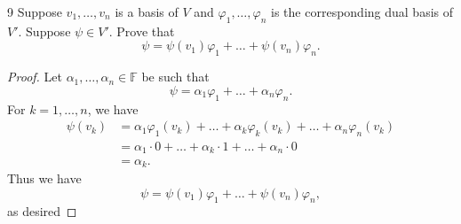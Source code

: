 \documentclass{extarticle}
\newenvironment{problem}[1]{\begin{prob*}{#1}{}}{\end{prob*}}
\newcommand{\F}{\mathbb{F}}
\begin{document}
\begin{problem}{9}
Suppose $v_1,\dots, v_n$ is a basis of $V$ and $\varphi_1,\dots,\varphi_n$ is the corresponding dual basis of $V'$.  Suppose $\psi\in V'$.  Prove that 
\begin{equation*}
\psi = \psi(v_1)\varphi_1 + \dots + \psi(v_n)\varphi_n.
\end{equation*}
\end{problem}
\begin{proof}
Let $\alpha_1,\dots,\alpha_n\in\F$ be such that
\begin{equation*}
\psi = \alpha_1\varphi_1 + \dots + \alpha_n\varphi_n.
\end{equation*}
For $k = 1,\dots, n$, we have
\begin{align*}
\psi(v_k) &= \alpha_1\varphi_1(v_k) + \dots + \alpha_k\varphi_k(v_k) + \dots + \alpha_n\varphi_n(v_k)\\
&= \alpha_1\cdot 0 + \dots + \alpha_k\cdot 1 + \dots + \alpha_n\cdot 0\\
&= \alpha_k.
\end{align*}
Thus we have
\begin{equation*}
\psi = \psi(v_1)\varphi_1 + \dots + \psi(v_n)\varphi_n,
\end{equation*}
as desired
\end{proof}
\end{document}
